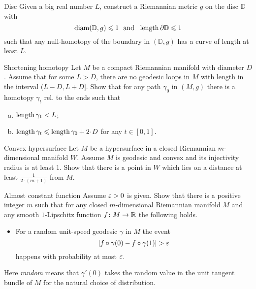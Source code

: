 \documentclass[twoside]{book}
\begin{document}
\begin{pr}{\hard}{Disc}\label{Disc}
Given a big real number $L$,
construct a Riemannian metric $g$ on the disc $\mathbb D$ 
with 
\[\diam(\mathbb D,g)\le 1
\ \ 
\text{and}
\ \ 
\length \partial\mathbb D\le 1  \]
such that any null-homotopy of the boundary in $(\mathbb D,g)$ 
has a curve of length at least $L$.
\end{pr}

\begin{pr}{}{Shortening homotopy}\label{short-homotopy}
Let $M$ be a compact Riemannian manifold with diameter $D$.
Assume that for some $L>D$,
there are no geodesic loops in $M$
with length in the interval $(L-D,L+ D]$.
Show that for any path $\gamma_0$ in $(M,g)$
there is a homotopy $\gamma_t$ rel. to the ends
such that 
\begin{enumerate}[a)]
\item $\operatorname{\rm length} \gamma_1<L$;
\item $\length \gamma_t\le \length \gamma_0+2\cdot D$ for any $t\in[0,1]$.
 
\end{enumerate}
\end{pr}

\begin{pr}{}{Convex hypersurface}\label{Convex hypersurface}
Let $M$ be a hypersurface 
in a closed Riemannian $m$-dimensional manifold $W$.
Assume $M$ is geodesic and convex
and its injectivity radius is at least $1$.
Show that there is a point in $W$  which lies on a distance at least  
$\frac{1}{2\cdot(m+1)}$ from $M$.
\end{pr}

\begin{pr}{}{Almost constant function}\label{Almost constant function}
Assume $\varepsilon>0$ is given.
Show that there is a positive integer $m$ such that
for any closed $m$-dimensional Riemannian manifold $M$
and any smooth $1$-Lipschitz function $f\colon M\to\mathbb{R}$ the following holds.
\begin{itemize}
\item For a random unit-speed geodesic $\gamma$ in $M$ 
the event 
\[|f\circ\gamma(0)-f\circ\gamma(1)|>\eps\]
happens with probability at most $\varepsilon$.
\end{itemize}
Here \emph{random} means that $\gamma'(0)$ takes the random value in the unit tangent bundle of $M$ for the natural choice of distribution.
\end{pr}
\end{document}
